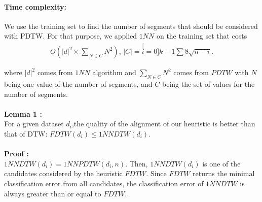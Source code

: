 \paragraph{Time complexity: }
We use the training set to find the number of segments that should be considered
with PDTW. For that purpose, we applied $1NN$ on the training set that costs
\begin{eqnarray}
O(|d|^{2} \times \underset{N\in C}{\sum}{\displaystyle
N^{2}}),\, |C|=\stackrel[i=0]{k-1}{\sum}{\textstyle 8\sqrt{n-i}}.
\end{eqnarray}


where $|d|^{2}$ comes from $1NN$ algorithm and
$\underset{N\in C}{\sum}{\displaystyle N^{2}}$ comes from $PDTW$ with $N$ being one value of the
number of segments, and  $C$ being the set of values for the number of segments. 



\paragraph{}\textbf{Lemma 1 : } \\
For a given dataset $d_i$,the quality of the alignment of our heuristic
is better than that of DTW: $ FDTW(d_{i}) \leq 1NNDTW(d_{i}) $.


\paragraph{}\textbf{Proof : } \\
 $1NNDTW(d_i) = 1NNPDTW(d_i,n)$. Then, $1NNDTW(d_i)$ is one of the
candidates considered by the heuristic $FDTW$. Since $FDTW$ returns the
minimal classification error from all candidates, the classification error of
$1NNDTW$ is always greater than or equal to $FDTW$.



